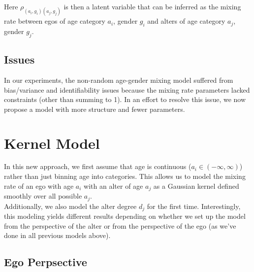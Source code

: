 \documentclass[12pt]{article}
\begin{document}
\noindent Here $\rho_{(a_i,g_i)(a_j,g_j)}$ is then a latent variable that can be inferred as the mixing rate between egos of age category $a_i$, gender $g_i$ and alters of age category $a_j$, gender $g_j$.

\subsection{Issues}
In our experiments, the non-random age-gender mixing model suffered from bias/variance and identifiability issues because the mixing rate parameters lacked constraints (other than summing to 1). In an effort to resolve this issue, we now propose a model with more structure and fewer parameters.

\section{Kernel Model}
In this new approach, we first assume that age is continuous ($a_i \in (-\infty,\infty)$) rather than just binning age into categories. This allows us to model the mixing rate of an ego with age $a_i$ with an alter of age $a_j$ as a Gaussian kernel defined smoothly over all possible $a_j$.\\

\noindent Additionally, we also model the alter degree $d_j$ for the first time. Interestingly, this modeling yields different results depending on whether we set up the model from the perspective of the alter or from the perspective of the ego (as we've done in all previous models above). 

\pagebreak
\subsection{Ego Perpsective}
\end{document}
